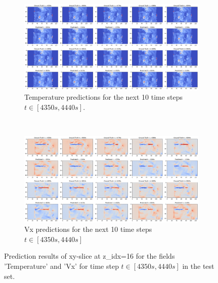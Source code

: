 \documentclass[final-report]{article-template}
\begin{document}
\begin{figure}[!htb]
    \centering
    \begin{subfigure}[t]{\textwidth}
        \centering
        \includegraphics[width=\textwidth]{figures/temp_10_4350.png}
        \caption{Temperature predictions for the next 10 time steps $t \in [4350s, 4440s]$.}
        \label{fig:pred_results_test_temp}
    \end{subfigure} \\[8mm]
    \begin{subfigure}[t]{\textwidth}
        \centering
        \includegraphics[width=\textwidth]{figures/vx_10_4350.png}
        \caption{Vx predictions for the next 10 time steps $t \in [4350s, 4440s]$}
    \end{subfigure}
    \caption{Prediction results of xy-slice at z\_idx=16 for the fields 'Temperature' and 'Vx' for time step $t \in [4350s, 4440s]$ in the test set.}
    \label{fig:pred_results_test}
\end{figure}
\end{document}
